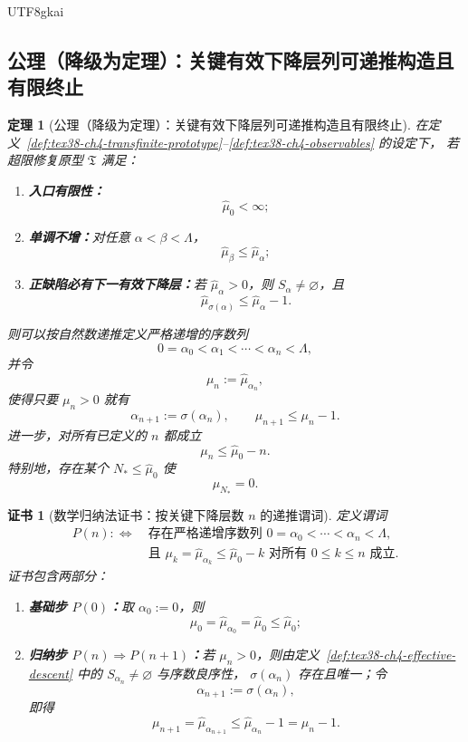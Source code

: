 \documentclass[12pt]{article}
\newtheorem{theorem}{定理}[section]
\newtheorem{Certificate}{证书}[section]
\begin{document}
\begin{CJK*}{UTF8}{gkai}
\subsection{公理（降级为定理）：关键有效下降层列可递推构造且有限终止}
\label{subsec:tex38-ch4-axiom}

\begin{theorem}[公理（降级为定理）：关键有效下降层列可递推构造且有限终止]
\label{thm:tex38-ch4-effective-skeleton}
在定义~\ref{def:tex38-ch4-transfinite-prototype}--\ref{def:tex38-ch4-observables} 的设定下，
若超限修复原型 $\mathfrak T$ 满足：
\begin{enumerate}
  \item \textbf{入口有限性：}
  \[
    \widehat\mu_0<\infty;
  \]
  \item \textbf{单调不增：}对任意 $\alpha<\beta<\Lambda$，
  \[
    \widehat\mu_\beta\le \widehat\mu_\alpha;
  \]
  \item \textbf{正缺陷必有下一有效下降层：}若 $\widehat\mu_\alpha>0$，则 $S_\alpha\neq\varnothing$，且
  \[
    \widehat\mu_{\sigma(\alpha)}
    \le
    \widehat\mu_\alpha-1.
  \]
\end{enumerate}
则可以按自然数递推定义严格递增的序数列
\[
  0=\alpha_0<\alpha_1<\cdots<\alpha_n<\Lambda,
\]
并令
\[
  \mu_n:=\widehat\mu_{\alpha_n},
\]
使得只要 $\mu_n>0$ 就有
\[
  \alpha_{n+1}:=\sigma(\alpha_n),
  \qquad
  \mu_{n+1}\le \mu_n-1.
\]
进一步，对所有已定义的 $n$ 都成立
\[
  \mu_n\le \widehat\mu_0-n.
\]
特别地，存在某个 $N_\ast\le \widehat\mu_0$ 使
\[
  \mu_{N_\ast}=0.
\]
\end{theorem}

\begin{Certificate}[数学归纳法证书：按关键下降层数 $n$ 的递推谓词]
\label{cert:tex38-ch4-effective-skeleton}
定义谓词
\[
  \begin{aligned}
    P(n)
    :
    \Longleftrightarrow\ &
    \text{存在严格递增序数列 }0=\alpha_0<\cdots<\alpha_n<\Lambda,\\
    &\text{且 }\mu_k=\widehat\mu_{\alpha_k}\le \widehat\mu_0-k
    \text{ 对所有 }0\le k\le n\text{ 成立}.
  \end{aligned}
\]
证书包含两部分：
\begin{enumerate}
  \item \textbf{基础步 $P(0)$：}取 $\alpha_0:=0$，则
  \[
    \mu_0=\widehat\mu_{\alpha_0}=\widehat\mu_0\le \widehat\mu_0;
  \]
  \item \textbf{归纳步 $P(n)\Rightarrow P(n+1)$：}若 $\mu_n>0$，则由定义~\ref{def:tex38-ch4-effective-descent} 中的 $S_{\alpha_n}
    \neq\varnothing$ 与序数良序性，
  $\sigma(\alpha_n)$ 存在且唯一；令
  \[
    \alpha_{n+1}:=\sigma(\alpha_n),
  \]
  即得
  \[
    \mu_{n+1}
    =
    \widehat\mu_{\alpha_{n+1}}
    \le
    \widehat\mu_{\alpha_n}-1
    =
    \mu_n-1.
  \]
\end{enumerate}
\end{Certificate}


\end{CJK*}
\end{document}
